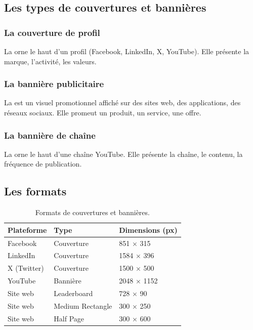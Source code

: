 \subsection{Les types de couvertures et bannières}

\subsubsection{La couverture de profil}

La  orne le haut d'un profil (Facebook, LinkedIn, X, YouTube). Elle présente la marque, l'activité, les valeurs.

\subsubsection{La bannière publicitaire}

La  est un visuel promotionnel affiché sur des sites web, des applications, des réseaux sociaux. Elle promeut un produit, un service, une offre.

\subsubsection{La bannière de chaîne}

La  orne le haut d'une chaîne YouTube. Elle présente la chaîne, le contenu, la fréquence de publication.

\subsection{Les formats}

\begin{table}[h!]
\centering
\begin{tabular}{@{}p{3cm}p{4cm}p{6cm}@{}}
\toprule
\textbf{Plateforme} & \textbf{Type} & \textbf{Dimensions (px)} \\
\midrule
Facebook & Couverture & 851 × 315 \\
LinkedIn & Couverture & 1584 × 396 \\
X (Twitter) & Couverture & 1500 × 500 \\
YouTube & Bannière & 2048 × 1152 \\
Site web & Leaderboard & 728 × 90 \\
Site web & Medium Rectangle & 300 × 250 \\
Site web & Half Page & 300 × 600 \\
\bottomrule
\end{tabular}
\caption{Formats de couvertures et bannières.}
\end{table}

